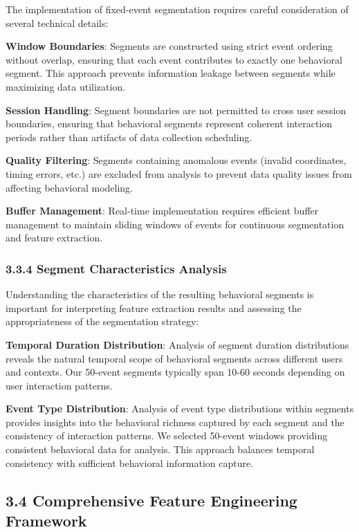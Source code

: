 \documentclass[
  11pt,
  a4paper,
]{article}
\begin{document}
The implementation of fixed-event segmentation requires careful
consideration of several technical details:

\textbf{Window Boundaries}: Segments are constructed using strict event
ordering without overlap, ensuring that each event contributes to
exactly one behavioral segment. This approach prevents information
leakage between segments while maximizing data utilization.

\textbf{Session Handling}: Segment boundaries are not permitted to cross
user session boundaries, ensuring that behavioral segments represent
coherent interaction periods rather than artifacts of data collection
scheduling.

\textbf{Quality Filtering}: Segments containing anomalous events
(invalid coordinates, timing errors, etc.) are excluded from analysis to
prevent data quality issues from affecting behavioral modeling.

\textbf{Buffer Management}: Real-time implementation requires efficient
buffer management to maintain sliding windows of events for continuous
segmentation and feature extraction.

\subsubsection{3.3.4 Segment Characteristics
Analysis}\label{segment-characteristics-analysis}

Understanding the characteristics of the resulting behavioral segments
is important for interpreting feature extraction results and assessing
the appropriateness of the segmentation strategy:

\textbf{Temporal Duration Distribution}: Analysis of segment duration
distributions reveals the natural temporal scope of behavioral segments
across different users and contexts. Our 50-event segments typically
span 10-60 seconds depending on user interaction patterns.

\textbf{Event Type Distribution}: Analysis of event type distributions
within segments provides insights into the behavioral richness captured
by each segment and the consistency of interaction patterns. We selected
50-event windows providing consistent behavioral data for analysis. This
approach balances temporal consistency with sufficient behavioral
information capture.

\subsection{3.4 Comprehensive Feature Engineering
Framework}\label{comprehensive-feature-engineering-framework}
\end{document}

